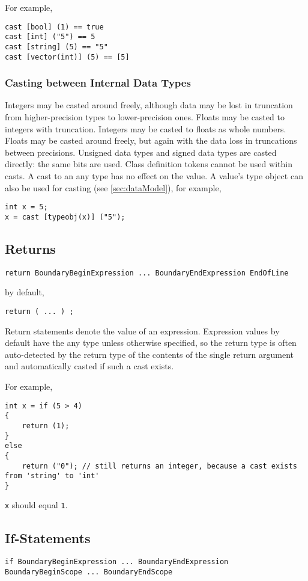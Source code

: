 \documentclass[10pt,a4paper]{article}
\begin{document}
For example,
\begin{verbatim}
cast [bool] (1) == true
cast [int] ("5") == 5
cast [string] (5) == "5"
cast [vector(int)] (5) == [5]
\end{verbatim}

\subsubsection{Casting between Internal Data Types}
Integers may be casted around freely, although data may be lost in truncation from higher-precision types to lower-precision ones. Floats may be casted to integers with truncation. Integers may be casted to floats as whole numbers. Floats may be casted around freely, but again with the data loss in truncations between precisions. Unsigned data types and signed data types are casted directly: the same bits are used. Class definition tokens cannot be used within casts. A cast to an any type has no effect on the value. A value's type object can also be used for casting (see \ref{sec:dataModel}), for example,
\begin{verbatim}
int x = 5;
x = cast [typeobj(x)] ("5");
\end{verbatim}

\subsection{Returns}
\begin{verbatim}
return BoundaryBeginExpression ... BoundaryEndExpression EndOfLine
\end{verbatim}

by default,
\begin{verbatim}
return ( ... ) ;
\end{verbatim}

Return statements denote the value of an expression. Expression values by default have the any type unless otherwise specified, so the return type is often auto-detected by the return type of the contents of the single return argument and automatically casted if such a cast exists.

For example,
\begin{verbatim}
int x = if (5 > 4)
{
    return (1);
}
else
{
    return ("0"); // still returns an integer, because a cast exists from 'string' to 'int'
}
\end{verbatim}
\verb|x| should equal \verb|1|.

\subsection{If-Statements}
\label{sec:ifStatements}
\begin{verbatim}
if BoundaryBeginExpression ... BoundaryEndExpression BoundaryBeginScope ... BoundaryEndScope
\end{verbatim}
\end{document}
